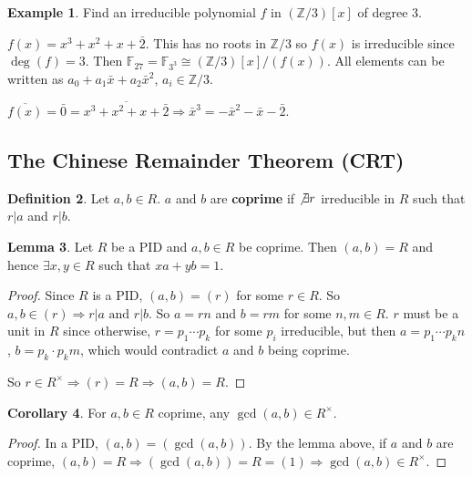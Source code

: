 \documentclass[12pt,a4paper]{article}
\theoremstyle{definition}
\newtheorem{definition}{Definition}[subsection]
\newtheorem{corollary}[definition]{Corollary}
\newtheorem{lemma}[definition]{Lemma}
\newtheorem{example}[definition]{Example}
\begin{document}
\begin{example}
	Find an irreducible polynomial $f$ in $(\mathbb{Z} / 3)[x]$ of degree $3$.
	
	$f(x) = x^3 + x^2 + x + \bar{2}$. This has no roots in $\mathbb{Z} / 3$ so $f(x)$ is irreducible since $\deg(f) = 3$. Then $\mathbb{F}_{27} = \mathbb{F}_{3^3} \cong (\mathbb{Z} / 3) [x] / (f(x))$. All elements can be written as $a_0 + a_1 \bar{x} + a_2 \bar{x}^2$, $a_i \in \mathbb{Z} / 3$.

	$\overline{f(x)} = \bar{0} = \overline{x^3 + x^2 + x + \bar{2}} \Rightarrow \bar{x}^3 = - \bar{x}^2 - \bar{x} - \bar{2}$.
\end{example}

\subsection{The Chinese Remainder Theorem (CRT)}

\begin{definition}
	Let $a, b \in R$. $a$ and $b$ are \textbf{coprime} if $\not\exists r$ irreducible in $R$ such that $r | a$ and $r | b$.
\end{definition}

\begin{lemma}
	Let $R$ be a PID and $a, b \in R$ be coprime. Then $(a, b) = R$ and hence $\exists x, y \in R$ such that $xa + yb = 1$.
\end{lemma}

\begin{proof}
	Since $R$ is a PID, $(a, b) = (r)$ for some $r \in R$. So $a, b \in (r) \Rightarrow r | a \text{ and } r | b$. So $a = rn$ and $b = rm$ for some $n, m \in R$. $r$ must be a unit in $R$ since otherwise, $r = p_1 \cdots p_k$ for some $p_i$ irreducible, but then $a = p_1 \cdots p_k n$, $b = p_k \cdot p_k m$, which would contradict $a$ and $b$ being coprime.

	So $r \in R^{\times} \Rightarrow (r) = R \Rightarrow (a, b) = R$.
\end{proof}

\begin{corollary}
	For $a, b \in R$ coprime, any $\gcd(a, b) \in R^{\times}$.
\end{corollary}

\begin{proof}
	In a PID, $(a, b) = (\gcd(a, b))$. By the lemma above, if $a$ and $b$ are coprime, $(a, b) = R \Rightarrow (\gcd(a, b)) = R = (1) \Rightarrow \gcd(a, b) \in R^{\times}$.
\end{proof}
\end{document}
